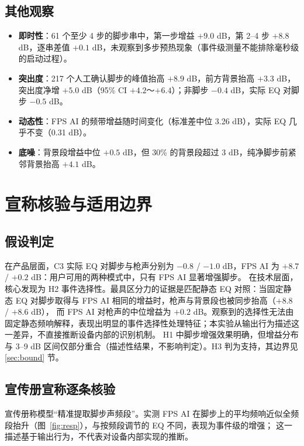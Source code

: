 \documentclass[11pt,a4paper]{ctexart}
\begin{document}
\subsection{其他观察}
\begin{itemize}
\item \textbf{即时性}：61 个至少 4 步的脚步串中，第一步增益 $+9.0$ dB，第 2--4 步 $+8.8$ dB，逐串差值 $+0.1$ dB，未观察到多步预热现象（事件级测量不能排除毫秒级的启动过程）。
\item \textbf{突出度}：217 个人工确认脚步的峰值抬高 $+8.9$ dB，前方背景抬高 $+3.3$ dB，突出度净增 $+5.0$ dB（95\% CI $+4.2$～$+6.4$）；非脚步 $-0.4$ dB，实际 EQ 对脚步 $-0.5$ dB。
\item \textbf{动态性}：FPS AI 的频带增益随时间变化（标准差中位 3.26 dB），实际 EQ 几乎不变（0.31 dB）。
\item \textbf{底噪}：背景段增益中位 $+0.5$ dB，但 30\% 的背景段超过 3 dB，纯净脚步前紧邻背景抬高 $+4.1$ dB。
\end{itemize}

\section{宣称核验与适用边界}
\subsection{假设判定}

在产品层面，C3 实际 EQ 对脚步与枪声分别为 $-0.8$ / $-1.0$ dB，FPS AI 为 $+8.7$ / $+0.2$ dB：用户可用的两种模式中，只有 FPS AI 显著增强脚步。
在技术层面，核心发现为 H2 事件选择性。最具区分力的证据是匹配静态 EQ 对照：当固定静态 EQ 对脚步取得与 FPS AI 相同的增益时，枪声与背景段也被同步抬高（$+8.8$ / $+8.6$ dB），
而 FPS AI 对枪声的中位增益为 $+0.2$ dB。观察到的选择性无法由固定静态频响解释，表现出明显的事件选择性处理特征；本实验从输出行为描述这一差异，不直接推断设备内部的识别机制。
H1 中脚步增强效果明确，但增益分布与 3--9 dB 区间仅部分重合（描述性结果，不影响判定）。H3 判为支持，其边界见 \ref{sec:bound} 节。

\subsection{宣传册宣称逐条核验}

宣传册称模型“精准提取脚步声频段”。实测 FPS AI 在脚步上的平均频响近似全频段抬升（图~\ref{fig:resp}），与按频段调节的 EQ 不同，表现为事件级的增强；
这一描述基于输出行为，不代表对设备内部实现的推断。
\end{document}

